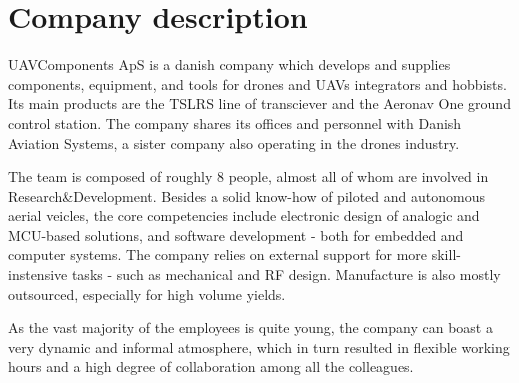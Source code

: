 \section{Company description}
UAVComponents ApS is a danish company which develops and supplies components, equipment, and tools for drones and UAVs integrators and hobbists.
Its main products are the TSLRS line of transciever and the Aeronav One ground control station.
The company shares its offices and personnel with Danish Aviation Systems, a sister company also operating in the drones industry. 

The team is composed of roughly 8 people, almost all of whom are involved in Research&Development. 
Besides a solid know-how of piloted and autonomous aerial veicles, the core competencies include electronic design of analogic and MCU-based solutions, and software development - both for embedded and computer systems. 
The company relies on external support for more skill-instensive tasks - such as mechanical and RF design. 
Manufacture is also mostly outsourced, especially for high volume yields.

As the vast majority of the employees is quite young, the company can boast a very dynamic and informal atmosphere, which in turn resulted in flexible working hours and a high degree of collaboration among all the colleagues.

